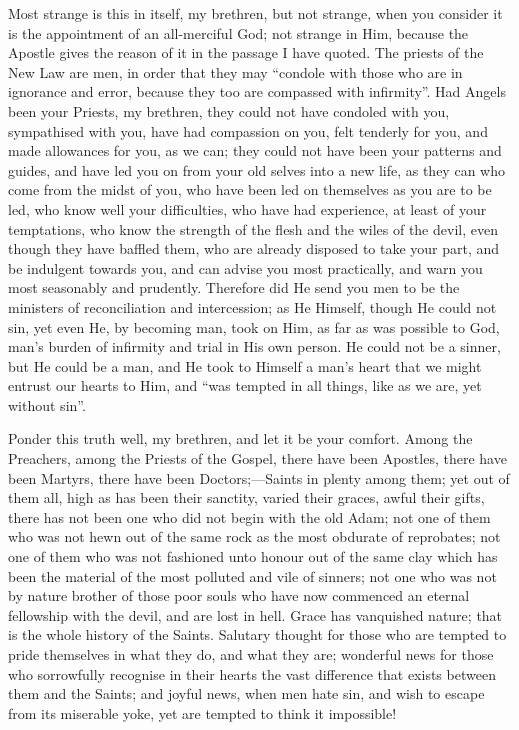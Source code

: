 Most strange is this in itself, my brethren, but not strange, when
you consider it is the appointment of an all-merciful God; not strange
in Him, because the Apostle gives the reason of it in the passage I
have quoted. The priests of the New Law are men, in order that they
may ``condole with those who are in ignorance and error, because
they too are compassed with infirmity''. Had Angels been your
Priests, my brethren, they could not have condoled with you,
sympathised with you, have had compassion on you, felt tenderly for
you, and made allowances for you, as we can; they could not have been
your patterns and guides, and have led you on from your old selves
into a new life, as they can who come from the midst of you, who have
been led on themselves as you are to be led, who know well your
difficulties, who have had experience, at least of your temptations,
who know the strength of the flesh and the wiles of the devil, even
though they have baffled them, who are already disposed to take your
part, and be indulgent towards you, and can advise you most
practically, and warn you most seasonably and prudently. Therefore did
He send you men to be the ministers of reconciliation and
intercession; as He Himself, though He could not sin, yet even He, by
becoming man, took on Him, as far as was possible to God, man's burden
of infirmity and trial in His own person. He could not be a sinner,
but He could be a man, and He took to Himself a man's heart that we
might entrust our hearts to Him, and ``was tempted in all things,
like as we are, yet without sin''.

Ponder this truth well, my brethren, and let it be your comfort.
Among the Preachers, among the Priests of the Gospel, there have been
Apostles, there have been Martyrs, there have been Doctors;—Saints
in plenty among them; yet out of them all, high as has been their
sanctity, varied their graces, awful their gifts, there has not been
one who did not begin with the old Adam; not one of them who was not
hewn out of the same rock as the most obdurate of reprobates; not one
of them who was not fashioned unto honour out of the same clay which
has been the material of the most polluted and vile of sinners; not
one who was not by nature brother of those poor souls who have now
commenced an eternal fellowship with the devil, and are lost in hell.
Grace has vanquished nature; that is the whole history of the Saints.
Salutary thought for those who are tempted to pride themselves in what
they do, and what they are; wonderful news for those who sorrowfully
recognise in their hearts the vast difference that exists between them
and the Saints; and joyful news, when men hate sin, and wish to escape
from its miserable yoke, yet are tempted to think it impossible!

